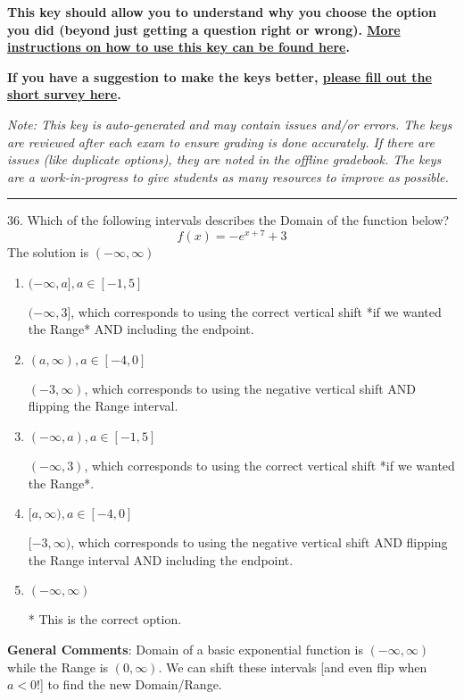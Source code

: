 \documentclass{extbook}[14pt]
\begin{document}
\textbf{This key should allow you to understand why you choose the option you did (beyond just getting a question right or wrong). \href{https://xronos.clas.ufl.edu/mac1105spring2020/courseDescriptionAndMisc/Exams/LearningFromResults}{More instructions on how to use this key can be found here}.}

\textbf{If you have a suggestion to make the keys better, \href{https://forms.gle/CZkbZmPbC9XALEE88}{please fill out the short survey here}.}

\textit{Note: This key is auto-generated and may contain issues and/or errors. The keys are reviewed after each exam to ensure grading is done accurately. If there are issues (like duplicate options), they are noted in the offline gradebook. The keys are a work-in-progress to give students as many resources to improve as possible.}

\rule{\textwidth}{0.4pt}

36. Which of the following intervals describes the Domain of the function below?
\[ f(x) = -e^{x+7}+3 \] 
The solution is $ (-\infty, \infty) $ 

\begin{enumerate}[label=\Alph*.] 
\item $ (-\infty, a], a \in [-1, 5] $ 

 $(-\infty, 3]$, which corresponds to using the correct vertical shift *if we wanted the Range* AND including the endpoint. 
\item $ (a, \infty), a \in [-4, 0] $ 

 $(-3, \infty)$, which corresponds to using the negative vertical shift AND flipping the Range interval. 
\item $ (-\infty, a), a \in [-1, 5] $ 

 $(-\infty, 3)$, which corresponds to using the correct vertical shift *if we wanted the Range*. 
\item $ [a, \infty), a \in [-4, 0] $ 

 $[-3, \infty)$, which corresponds to using the negative vertical shift AND flipping the Range interval AND including the endpoint. 
\item $ (-\infty, \infty) $ 

 * This is the correct option. 
\end{enumerate} 
 
\textbf{General Comments}: Domain of a basic exponential function is $(-\infty, \infty)$ while the Range is $(0, \infty)$. We can shift these intervals [and even flip when $a<0$!] to find the new Domain/Range.
\end{document}
